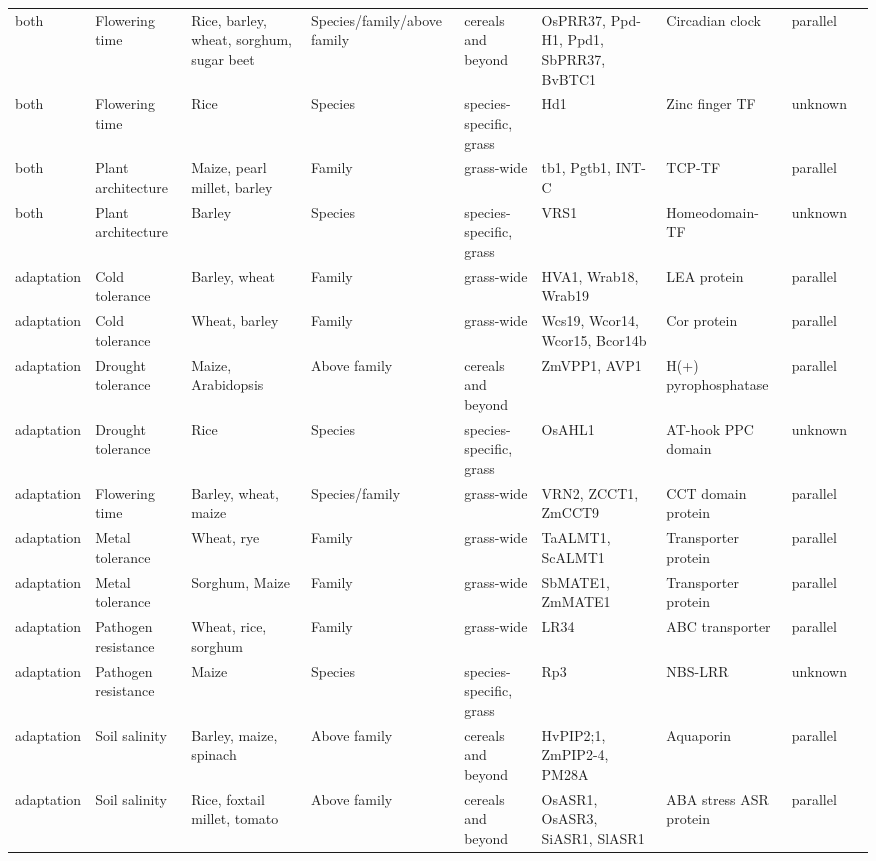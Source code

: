 \documentclass[12pt]{article}
\begin{document}
\begin{table}
\begin{center}
\begin{tabular}{C{1.5cm}G{2.5cm}C{3.10cm}C{3.2cm}C{2.3cm}G{3.5cm}G{2.1cm}C{1.3cm}G{1.5cm}}
 both & Flowering time &Rice, barley, wheat, sorghum, sugar beet & Species/family/above family & cereals and beyond & OsPRR37, Ppd-H1, Ppd1, SbPRR37, BvBTC1 & Circadian clock& parallel & \citep{MURAKAMI2005, Turner2005, Jones2008, Beales2007, Wilhelm2008, Daz2012}\\
 both & Flowering time &Rice & Species & species-specific, grass & Hd1 & Zinc finger TF & unknown & \citep{Martin2013}\\
 both & Plant architecture &Maize, pearl millet, barley & Family & grass-wide & tb1, Pgtb1, INT-C & TCP-TF & parallel & \citep{Studer2011, Remigereau2011, Ramsay2011}\\
 both & Plant architecture &Barley & Species & species-specific, grass & VRS1 & Homeodomain-TF & unknown & \citep{Martin2013}\\
 adaptation & Cold tolerance &Barley, wheat & Family & grass-wide & HVA1, Wrab18, Wrab19 & LEA protein & parallel & \citep{Hong1988, pmid16755132}\\
 adaptation & Cold tolerance &Wheat, barley & Family & grass-wide & Wcs19, Wcor14, Wcor15, Bcor14b & Cor protein & parallel & \citep{Takumi2003}\\
 adaptation & Drought tolerance &Maize, Arabidopsis & Above family & cereals and beyond & ZmVPP1, AVP1 & H(+) pyrophosphatase & parallel & \citep{Wang2016}\\
 adaptation & Drought tolerance &Rice & Species & species-specific, grass & OsAHL1 & AT-hook PPC domain & unknown & \citep{Zhou2016}\\
 adaptation & Flowering time &Barley, wheat, maize & Species/family & grass-wide & VRN2, ZCCT1, ZmCCT9 & CCT domain protein& parallel & \citep{Huang2017}\\
 adaptation & Metal tolerance &Wheat, rye & Family & grass-wide & TaALMT1, ScALMT1 & Transporter protein & parallel & \citep{Martin2013}\\
 adaptation & Metal tolerance &Sorghum, Maize & Family & grass-wide & SbMATE1, ZmMATE1 & Transporter protein & parallel & \citep{Martin2013}\\
 adaptation & Pathogen resistance &Wheat, rice, sorghum & Family & grass-wide & LR34 & ABC transporter & parallel & \citep{Krattinger2010}\\
 adaptation & Pathogen resistance &Maize & Species & species-specific, grass & Rp3 & NBS-LRR & unknown & \citep{pmid12242248}\\
 adaptation & Soil salinity &Barley, maize, spinach & Above family & cereals and beyond & HvPIP2;1, ZmPIP2-4, PM28A & Aquaporin & parallel & \citep{Katsuhara2002, Zhu2005, Fotiadis2000}\\
 adaptation & Soil salinity &Rice, foxtail millet, tomato & Above family & cereals and beyond & OsASR1, OsASR3, SiASR1, SlASR1 & ABA stress ASR protein & parallel & \citep{Li2017, Konrad2008}\\
\end{tabular}
\end{center}
\end{table}
\end{document}
